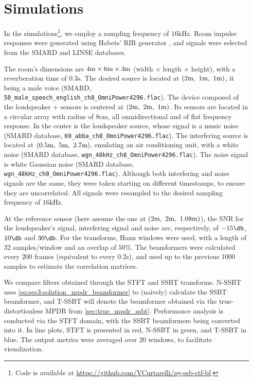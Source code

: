 
\section{Simulations}
\label{sec:results}

In the simulations\footnote{Code is available at \url{https://github.com/VCurtarelli/py-ssb-ctf-bf}.}, we employ a sampling frequency of $16\si{\kilo\hertz}$. Room impulse responses were generated using Habets' RIR generator \cite{habets_rir-generator}, and signals were selected from the SMARD \cite{smard_database} and LINSE \cite{linse_database} databases.

The room's dimensions are $4\si{\meter} \times 6\si{\meter} \times 3\si{\meter}$ (width $\times$ length $\times$ height), with a reverberation time of $0.3\si{\second}$. The desired source is located at $(2\si{\meter},~1\si{\meter},~1\si{\meter})$, it being a male voice (SMARD, \texttt{50\_male\_speech\_english\_ch8\_OmniPower4296.flac}).
%
The device composed of the loudspeaker + sensors is centered at $(2\si{\meter},~2\si{\meter},~1\si{\meter})$. Its sensors are located in a circular array with radius of $8\si{\centi\meter}$, all omnidirectional and of flat frequency response. In the center is the loudspeaker source, whose signal is a music noise (SMARD database, \texttt{69\_abba\_ch8\_OmniPower4296.flac}). The interfering source is located at $(0.5\si{\meter},~5\si{\meter},~2.7\si{\meter})$, emulating an air conditioning unit, with a white noise (SMARD database, \texttt{wgn\_48kHz\_ch8\_OmniPower4296.flac}). The noise signal is white Gaussian noise (SMARD database, \texttt{wgn\_48kHz\_ch8\_OmniPower4296.flac}). Although both interfering and noise signals are the same, they were taken starting on different timestamps, to ensure they are uncorrelated. All signals were resampled to the desired sampling frequency of $16\si{\kilo\hertz}$.

At the reference sensor (here assume the one at $(2\si{\meter},~2\si{\meter},~1.08\si{\meter})$), the SNR for the loudspeaker's signal, interfering signal and noise are, respectively, of $-15\dB$, $10\dB$ and $30\dB$. For the transforms, Hann windows were used, with a length of 32 samples/window and an overlap of $50\%$. The beamformers were calculated every 200 frames (equivalent to every $0.2\si{\second}$), and used up to the previous 1000 samples to estimate the correlation matrices.

We compare filters obtained through the STFT and SSBT transforms. N-SSBT uses \cref{eq:sec3:solution_mpdr_beamformer} to (naively) calculate the SSBT beamformer, and T-SSBT will denote the beamformer obtained via the true-distortionless MPDR from \cref{sec:true_mpdr_ssbt}. Performance analysis is conducted via the STFT domain, with the SSBT beamformers being converted into it. In line plots, STFT is presented in red, N-SSBT in green, and T-SSBT in blue. The output metrics were averaged over 20 windows, to facilitate visualization.

